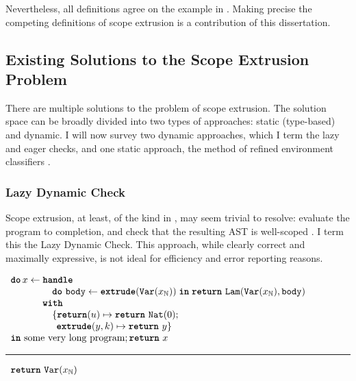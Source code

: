 Nevertheless, all definitions agree on the example in . Making precise the competing definitions of scope extrusion is a contribution of this dissertation. 

\subsection{Existing Solutions to the Scope Extrusion Problem}
There are multiple solutions to the problem of scope extrusion. The solution space can be broadly divided into two types of approaches: static (type-based) and dynamic. I will now survey two dynamic approaches, which I term the lazy and eager checks, and one static approach, the method of refined environment classifiers \citep{kiselyov-16,isoda-24}. 

\subsubsection{Lazy Dynamic Check}\label{subsubsection:lazy-dynamic-check}
Scope extrusion, at least, of the kind in , may seem trivial to resolve: evaluate the program to completion, and check that the resulting AST is well-scoped \citep{kiselyov-14}. I term this the Lazy Dynamic Check. This approach, while clearly correct and maximally expressive, is not ideal for efficiency and error reporting reasons. 

\begin{code}
  \begin{efflst}
    $\begin{array}{l}
      \textbf{\texttt{do}} \,  x \leftarrow \textbf{\texttt{handle}} \\
      \quad \quad \quad \quad \,\, \texttt{\textbf{do}} \,\, {\texttt{body}} \leftarrow {\textbf{\texttt{extrude}}({\texttt{Var}(x_{\mathbb{N}})})} \; \textbf{\texttt{in}} \; {\texttt{\textbf{return}} \,\, {\texttt{Lam}(\texttt{Var}(x_{\mathbb{N}}), \texttt{body})}} \\
      \quad \quad \quad \,\, \textbf{\texttt{with}} \\
      \quad \quad \quad \quad \, \, \{ \textbf{\texttt{return}}(u) \mapsto {\texttt{\textbf{return}} \,\, {\texttt{Nat}(0)}}; \\
      \quad \quad \quad \quad \, \, \; \, \textbf{\texttt{extrude}}(y, k) \mapsto {\texttt{\textbf{return}} \,\, {y}}\}\\
      \textbf{\texttt{in}} \text{ some very long program}; \texttt{\textbf{return}} \,\, {x}
    \end{array}$

    \vspace{2mm} 
\textcolor{effComment}{\hrule height 0.2mm \relax}
\vspace{2mm} 

\textcolor{effComment}{$\begin{array}{l}\texttt{\textbf{return}} \,\, {\texttt{Var}(x_{\mathbb{N}})}\end{array}$}

\end{efflst}
%
\label{listing:efflang-lazy-scope-extrusion-inefficient}
\end{code}


